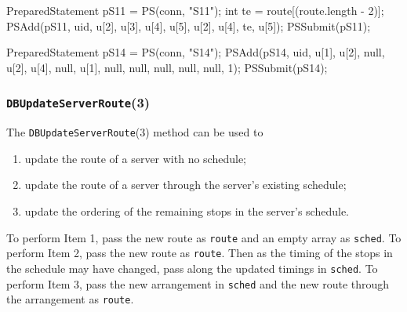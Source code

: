 \documentclass{article}
\def\nwendcode{\endtrivlist \endgroup}      %
\let\nwdocspar=\par
\theoremstyle{definition}                   %
\begin{document}
\nwenddocs{}\endmoddef{}
PreparedStatement pS11 = PS(conn, "S11");
int te = route[(route.length - 2)];
PSAdd(pS11, uid, u[2], u[3], u[4], u[5], u[2], u[4], te, u[5]);
PSSubmit(pS11);
\nwendcode{}\nwdocspar
\nwenddocs{}\endmoddef{}
PreparedStatement pS14 = PS(conn, "S14");
PSAdd(pS14, uid, u[1], u[2], null, u[2], u[4], null, u[1],
    null, null, null, null, null, 1);
PSSubmit(pS14);
\nwendcode{}\nwdocspar

\subsubsection{{\tt{}\protect{}DBUpdateServerRoute}(3)}
The {\tt{}\protect{}DBUpdateServerRoute}(3) method can be used to
\begin{enumerate}
\item update the route of a server with no schedule;
\item update the route of a server through the server's existing schedule;
\item update the ordering of the remaining stops in the server's schedule.
\end{enumerate}
To perform Item 1, pass the new route as {\tt{}route} and an empty array as
{\tt{}sched}. To perform Item 2, pass the new route as {\tt{}route}. Then as the
timing of the stops in the schedule may have changed, pass along the updated
timings in {\tt{}sched}. To perform Item 3, pass the new arrangement in {\tt{}sched}
and the new route through the arrangement as {\tt{}route}.
\end{document}
